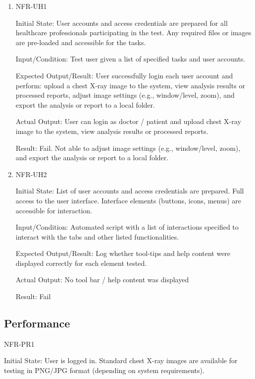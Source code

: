 \documentclass[12pt, titlepage]{article}
\begin{document}
\begin{enumerate}

  \item{NFR-UH1\\}\label{NFR-UH1}

  Initial State: User accounts and access credentials are prepared for all healthcare professionals participating in the test. Any required files or images are pre-loaded and accessible for the tasks.

  Input/Condition: Test user given a list of specified tasks and user accounts.

  Expected Output/Result: User successfully login each user account and perform: upload a chest X-ray image to the system, view analysis results or processed reports, adjust image settings (e.g., window/level, zoom), and export the analysis or report to a local folder.

  Actual Output: User can login as doctor / patient and upload chest X-ray image to the system, view analysis results or processed reports.

  Result: Fail. Not able to adjust image settings (e.g., window/level, zoom), and export the analysis or report to a local folder.

\item{NFR-UH2\\}\label{NFR-UH2}

Initial State: List of user accounts and access credentials are prepared. Full access to the user interface. Interface elements (buttons, icons, menus) are accessible for interaction.

Input/Condition: Automated script with a list of interactions specified to interact with the tabs and other listed functionalities.

Expected Output/Result: Log whether tool-tips and help content were displayed correctly for each element tested.

Actual Output: No tool bar / help content was displayed 

Result: Fail

\end{enumerate}

\subsection{Performance}
\item{NFR-PR1\\}\label{NFR-PR1}

Initial State: User is logged in. Standard chest X-ray images are available for testing in PNG/JPG format (depending on system requirements).
\end{document}

